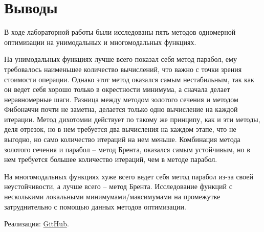 \documentclass[12pt]{article}
\begin{document}
\newpage
\section{Выводы}

В ходе лабораторной работы были исследованы пять методов одномерной оптимизации на унимодальных и многомодальных функциях. 

На унимодальных функциях лучше всего показал себя метод парабол, ему требовалось наименьшее количество вычислений, что важно с точки зрения стоимости операции. Однако этот метод оказался самым нестабильным, так как он ведет себя хорошо только в окрестности минимума, а сначала делает неравномерные шаги. Разница между методом золотого сечения и методом Фибоначчи почти не заметна, делается только одно вычисление на каждой итерации. Метод дихотомии действует по такому же принципу, как и эти методы, деля отрезок, но в нем требуется два вычисления на каждом этапе, что не выгодно, но само количество итераций на нем меньше. Комбинация метода золотого сечения и парабол -- метод Брента, оказался самым устойчивым, но в нем требуется большее количество итераций, чем в методе парабол.

На многомодальных функциях хуже всего ведет себя метод парабол из-за своей неустойчивости, а лучше всего -- метод Брента. Исследование функций с несколькими локальными минимумами/максимумами на промежутке затруднительно с помощью данных методов оптимизации.

Реализация: \href{https://github.com/Mr3zee/ITMO-Optimization-Methods-LAB1-2021/}{GitHub}.
\end{document}
